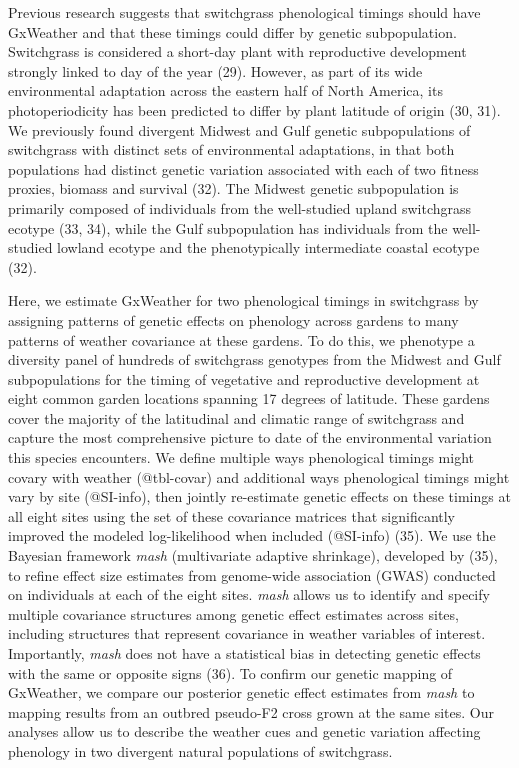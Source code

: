 \documentclass[
  9pt,
  twocolumn,
  twoside]{pnas-new}
\begin{document}
Previous research suggests that switchgrass phenological timings should
have GxWeather and that these timings could differ by genetic
subpopulation. Switchgrass is considered a short-day plant with
reproductive development strongly linked to day of the year (29).
However, as part of its wide environmental adaptation across the eastern
half of North America, its photoperiodicity has been predicted to differ
by plant latitude of origin (30, 31). We previously found divergent
Midwest and Gulf genetic subpopulations of switchgrass with distinct
sets of environmental adaptations, in that both populations had distinct
genetic variation associated with each of two fitness proxies, biomass
and survival (32). The Midwest genetic subpopulation is primarily
composed of individuals from the well-studied upland switchgrass ecotype
(33, 34), while the Gulf subpopulation has individuals from the
well-studied lowland ecotype and the phenotypically intermediate coastal
ecotype (32).

Here, we estimate GxWeather for two phenological timings in switchgrass
by assigning patterns of genetic effects on phenology across gardens to
many patterns of weather covariance at these gardens. To do this, we
phenotype a diversity panel of hundreds of switchgrass genotypes from
the Midwest and Gulf subpopulations for the timing of vegetative and
reproductive development at eight common garden locations spanning 17
degrees of latitude. These gardens cover the majority of the latitudinal
and climatic range of switchgrass and capture the most comprehensive
picture to date of the environmental variation this species encounters.
We define multiple ways phenological timings might covary with weather
(@tbl-covar) and additional ways phenological timings might vary by site
(@SI-info), then jointly re-estimate genetic effects on these timings at
all eight sites using the set of these covariance matrices that
significantly improved the modeled log-likelihood when included
(@SI-info) (35). We use the Bayesian framework \emph{mash} (multivariate
adaptive shrinkage), developed by (35), to refine effect size estimates
from genome-wide association (GWAS) conducted on individuals at each of
the eight sites. \emph{mash} allows us to identify and specify multiple
covariance structures among genetic effect estimates across sites,
including structures that represent covariance in weather variables of
interest. Importantly, \emph{mash} does not have a statistical bias in
detecting genetic effects with the same or opposite signs (36). To
confirm our genetic mapping of GxWeather, we compare our posterior
genetic effect estimates from \emph{mash} to mapping results from an
outbred pseudo-F2 cross grown at the same sites. Our analyses allow us
to describe the weather cues and genetic variation affecting phenology
in two divergent natural populations of switchgrass.
\end{document}
